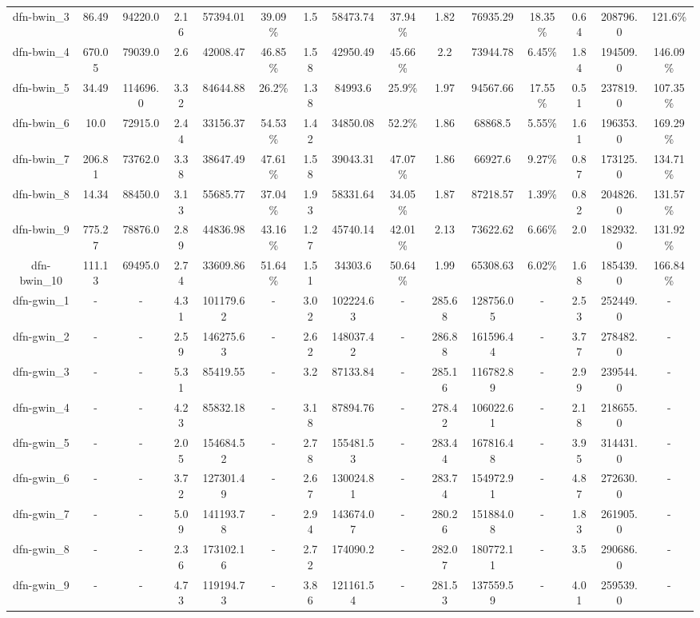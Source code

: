 \documentclass[main.tex]{subfiles}
\begin{document}
\begin{landscape}
\begin{table}[h]
{\begin{tabular}{c|cc|ccc|ccc|ccc|ccc}
	dfn-bwin\_3 &86.49 &94220.0 &2.16 &57394.01 &39.09\% &1.5 &58473.74 &37.94\% &1.82 &76935.29 &18.35\% &0.64 &208796.0 &121.6\%\\
	dfn-bwin\_4 &670.05 &79039.0 &2.6 &42008.47 &46.85\% &1.58 &42950.49 &45.66\% &2.2 &73944.78 &6.45\% &1.84 &194509.0 &146.09\%\\
	dfn-bwin\_5 &34.49 &114696.0 &3.32 &84644.88 &26.2\% &1.38 &84993.6 &25.9\% &1.97 &94567.66 &17.55\% &0.51 &237819.0 &107.35\%\\
	dfn-bwin\_6 &10.0 &72915.0 &2.44 &33156.37 &54.53\% &1.42 &34850.08 &52.2\% &1.86 &68868.5 &5.55\% &1.61 &196353.0 &169.29\%\\
	dfn-bwin\_7 &206.81 &73762.0 &3.38 &38647.49 &47.61\% &1.58 &39043.31 &47.07\% &1.86 &66927.6 &9.27\% &0.87 &173125.0 &134.71\%\\
	dfn-bwin\_8 &14.34 &88450.0 &3.13 &55685.77 &37.04\% &1.93 &58331.64 &34.05\% &1.87 &87218.57 &1.39\% &0.82 &204826.0 &131.57\%\\
	dfn-bwin\_9 &775.27 &78876.0 &2.89 &44836.98 &43.16\% &1.27 &45740.14 &42.01\% &2.13 &73622.62 &6.66\% &2.0 &182932.0 &131.92\%\\
	dfn-bwin\_10 &111.13 &69495.0 &2.74 &33609.86 &51.64\% &1.51 &34303.6 &50.64\% &1.99 &65308.63 &6.02\% &1.68 &185439.0 &166.84\%\\
	dfn-gwin\_1 &- &- &4.31 &101179.62 &- &3.02 &102224.63 &- &285.68 &128756.05 &- &2.53 &252449.0 &-\\
	dfn-gwin\_2 &- &- &2.59 &146275.63 &- &2.62 &148037.42 &- &286.88 &161596.44 &- &3.77 &278482.0 &-\\
	dfn-gwin\_3 &- &- &5.31 &85419.55 &- &3.2 &87133.84 &- &285.16 &116782.89 &- &2.99 &239544.0 &-\\
	dfn-gwin\_4 &- &- &4.23 &85832.18 &- &3.18 &87894.76 &- &278.42 &106022.61 &- &2.18 &218655.0 &-\\
	dfn-gwin\_5 &- &- &2.05 &154684.52 &- &2.78 &155481.53 &- &283.44 &167816.48 &- &3.95 &314431.0 &-\\
	dfn-gwin\_6 &- &- &3.72 &127301.49 &- &2.67 &130024.81 &- &283.74 &154972.91 &- &4.87 &272630.0 &-\\
	dfn-gwin\_7 &- &- &5.09 &141193.78 &- &2.94 &143674.07 &- &280.26 &151884.08 &- &1.83 &261905.0 &-\\
	dfn-gwin\_8 &- &- &2.36 &173102.16 &- &2.72 &174090.2 &- &282.07 &180772.11 &- &3.5 &290686.0 &-\\
	dfn-gwin\_9 &- &- &4.73 &119194.73 &- &3.86 &121161.54 &- &281.53 &137559.59 &- &4.01 &259539.0 &-\\

\end{tabular}}
\end{table}
\end{landscape}
\end{document}
